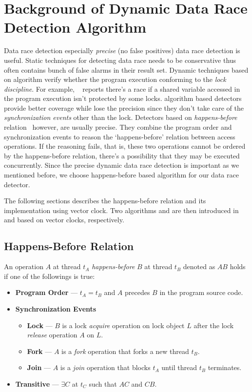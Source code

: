 \chapter{Background of Dynamic Data Race Detection Algorithm}
\label{c:background}

Data race detection especially \textit{precise} (no false positives) data race detection is useful. Static techniques for detecting data race needs to be conservative thus often contains bunch of false alarms in their result set. Dynamic techniques based on \Lockset{} algorithm verify whether the program execution conforming to the \textit{lock discipline}. For example, \Eraser{}~\cite{Savage:1997p280} reports there's a race if a shared variable accessed in the program execution isn't protected by some locks. \Lockset{} algorithm based detectors provide better coverage while lose the precision since they don't take care of the \textit{synchronization events} other than the lock. Detectors based on \textit{happens-before} relation~\cite{Lamport:1978p527} however, are usually precise. They combine the program order and synchronization events to reason the `happens-before' relation between access operations. If the reasoning fails, that is, these two operations cannot be ordered by the happens-before relation, there's a possibility that they may be executed concurrently. Since the precise dynamic data race detection is important as we mentioned before, we choose happens-before based algorithm for our data race detector.

The following sections describes the happens-before relation and its implementation using vector clock. Two algorithms \Djitp{} and \FastTrack{} are then introduced in  and  based on vector clocks, respectively.

\section{Happens-Before Relation}
An operation $A$ at thread $t_A$ \textit{happens-before} $B$ at thread $t_B$ denoted as $A$\hb{}$B$ holds if one of the followings is true:
\begin{itemize}
	\item \textbf{Program Order} --- $t_A = t_B$ and $A$ precedes $B$ in the program source code.
	\item \textbf{Synchronization Events}
	\begin{itemize}
		\item \textbf{Lock} --- $B$ is a lock \textit{acquire} operation on lock object $L$ after the lock \textit{release} operation $A$ on $L$.
		\item \textbf{Fork} --- $A$ is a \textit{fork} operation that forks a new thread $t_B$.
		\item \textbf{Join} --- $A$ is a \textit{join} operation that blocks $t_A$ until thread $t_B$ terminates.
	\end{itemize}
	\item \textbf{Transitive} --- $\exists C$ at $t_C$ such that $A$\hb{}$C$ and $C$\hb{}$B$.
\end{itemize}

